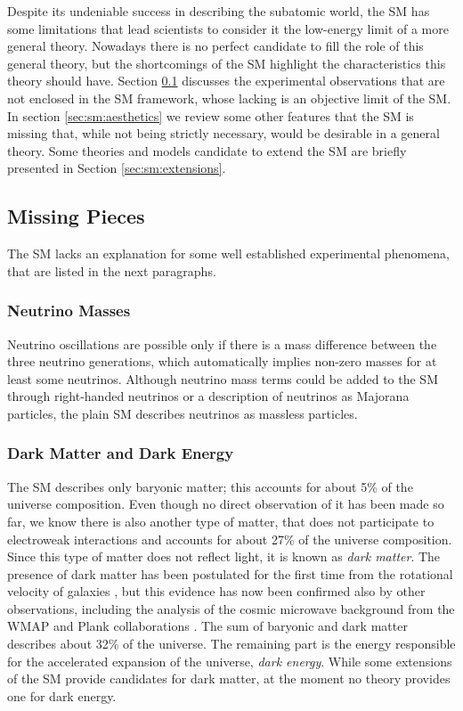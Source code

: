 Despite its undeniable success in describing the subatomic world, the SM has some limitations that lead scientists to consider it the low-energy limit of a more general theory. Nowadays there is no perfect candidate to fill the role of this general theory, but the shortcomings of the SM highlight the characteristics this theory should have. Section \ref{sec:sm:missingpieces} discusses the experimental observations that are not enclosed in the SM framework, whose lacking is an objective limit of the SM. In section \ref{sec:sm:aesthetics} we review some other features that the SM is missing that, while not being strictly necessary, would be desirable in a general theory. Some theories and models candidate to extend the SM are briefly presented in Section \ref{sec:sm:extensions}.

\subsection{Missing Pieces}
\label{sec:sm:missingpieces}

The SM lacks an explanation for some well established experimental phenomena, that are listed in the next paragraphs.

\subsubsection*{Neutrino Masses}

Neutrino oscillations \cite{PhysRevLett.81.1562} are possible only if there is a mass difference between the three neutrino generations, which automatically implies non-zero masses for at least some neutrinos. Although neutrino mass terms could be added to the SM through right-handed neutrinos or a description of neutrinos as Majorana particles, the plain SM describes neutrinos as massless particles.

\subsubsection*{Dark Matter and Dark Energy}

The SM describes only baryonic matter; this accounts for about 5\% of the universe composition. Even though no direct observation of it has been made so far, we know there is also another type of matter, that does not participate to electroweak interactions and  accounts for about 27\% of the universe composition.  Since this type of matter does not reflect light, it is known as \textit{dark matter}. The presence of dark matter has been postulated for the first time from the rotational velocity of galaxies \cite{Zwicky:1937zza}, but this evidence has now been confirmed also by other observations, including the analysis of the cosmic microwave background from the WMAP and Plank collaborations \cite{Larson:2010gs} \cite{Ade:2013zuv}. The sum of baryonic and dark matter describes about 32\% of the universe. The remaining part is the energy responsible for the accelerated expansion of the universe, \textit{dark energy}. While some extensions of the SM provide candidates for dark matter, at the moment no theory provides one for dark energy.



